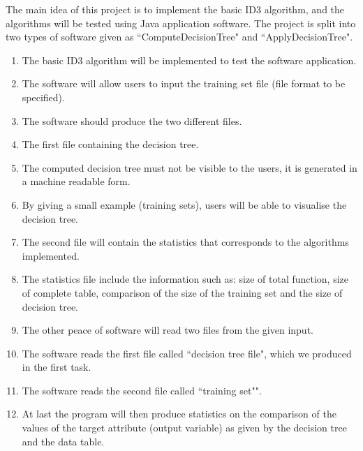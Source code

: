 \documentclass{report}
\begin{document}
The main idea of this project is to implement the basic ID3 algorithm, and the algorithms will be tested using Java application software. The project is split into two types of software given as ``ComputeDecisionTree" and ``ApplyDecisionTree". 

    
\begin{enumerate}


\item The basic ID3 algorithm will be implemented to test the software application.

\item The software will allow users to input the training set file (file format to be specified).
   
\item The software should produce the two different files.
  
\item The first file containing the decision tree.

\item The computed decision tree must not be visible to the users, it is generated in a machine readable form. 
	
\item By giving a small example (training sets), users will be able to visualise the decision tree. 
	
\item The second file will contain the statistics that corresponds to the algorithms implemented.
	
\item The statistics file include the information such as: size of total function, size of complete table, comparison of the size of the training set and the size of decision tree.
	
\item The other peace of software will read two files from the given input.

\item The software reads the first file called ``decision tree file", which we produced in the first task.

\item The software reads the second file called ``training set"".
	
\item At last the program will then produce statistics on the comparison of the values of the target attribute (output variable) as given by the decision tree and the data table.\\
\end{enumerate}
\end{document}
